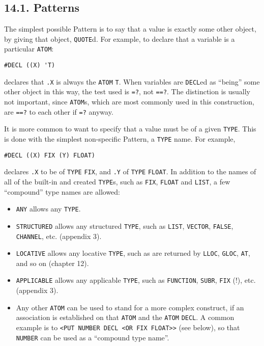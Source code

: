 \documentclass[a4paper,]{article}
\providecommand{\tightlist}{%
  \setlength{\itemsep}{0pt}\setlength{\parskip}{0pt}}
\begin{document}
\subsection{14.1. Patterns}\label{patterns}

The simplest possible Pattern is to say that a value is exactly some other object, by giving that object, \texttt{QUOTE}d.
For example, to declare that a variable is a particular \texttt{ATOM}:

\begin{verbatim}
#DECL ((X) 'T)
\end{verbatim}

declares that \texttt{.X} is always the \texttt{ATOM} \texttt{T}. When variables are \texttt{DECL}ed as ``being'' some
other object in this way, the test used is \texttt{=?}, not \texttt{==?}. The distinction is usually not important, since
\texttt{ATOM}s, which are most commonly used in this construction, are \texttt{==?} to each other if \texttt{=?} anyway.

It is more common to want to specify that a value must be of a given \texttt{TYPE}. This is done with the simplest
non-specific Pattern, a \texttt{TYPE} name. For example,

\begin{verbatim}
#DECL ((X) FIX (Y) FLOAT)
\end{verbatim}

declares \texttt{.X} to be of \texttt{TYPE} \texttt{FIX}, and \texttt{.Y} of \texttt{TYPE} \texttt{FLOAT}. In addition to
the names of all of the built-in and created \texttt{TYPE}s, such as \texttt{FIX}, \texttt{FLOAT} and \texttt{LIST}, a few
``compound'' type names are allowed:

\begin{itemize}
\tightlist
\item
  \texttt{ANY}  allows any \texttt{TYPE}.
\item
  \texttt{STRUCTURED}  allows any structured \texttt{TYPE}, such as \texttt{LIST},
  \texttt{VECTOR}, \texttt{FALSE}, \texttt{CHANNEL}, etc. (appendix 3).
\item
  \texttt{LOCATIVE}  allows any locative \texttt{TYPE}, such as are returned by
  \texttt{LLOC}, \texttt{GLOC}, \texttt{AT}, and so on (chapter 12).
\item
  \texttt{APPLICABLE}  allows any applicable \texttt{TYPE}, such as \texttt{FUNCTION},
  \texttt{SUBR}, \texttt{FIX} (!), etc. (appendix 3).
\item
  Any other \texttt{ATOM} can be used to stand for a more complex construct, if an association is established on that
  \texttt{ATOM} and the \texttt{ATOM} \texttt{DECL}. A common example is to
  \texttt{\textless{}PUT\ NUMBER\ DECL\ \textquotesingle{}\textless{}OR\ FIX\ FLOAT\textgreater{}\textgreater{}} (see
  below), so that \texttt{NUMBER} can be used as a ``compound type name''.
\end{itemize}
\end{document}

